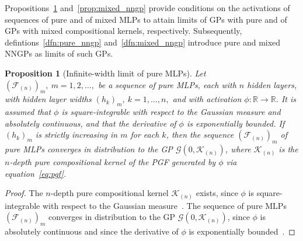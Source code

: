 \documentclass[final, 12pt]{colt2021} %
\newtheorem{prop}{Proposition}
\begin{document}
Propositions~\ref{prop:pure_nngp} and~\ref{prop:mixed_nngp}
provide conditions
on the activations of sequences of pure and of mixed MLPs
to attain limits of GPs with
pure and of GPs with mixed compositional kernels, respectively.
Subsequently,
defintions~\ref{dfn:pure_nngp} and~\ref{dfn:mixed_nngp}
introduce pure and mixed NNGPs
as limits of such GPs.


\begin{prop}[Infinite-width limit of pure MLPs]
\label{prop:pure_nngp}
Let $(\mathcal{F}_{(n)})_{m},~m=1,2,\ldots,$ be a sequence
of pure MLPs,
each with $n$ hidden layers,
with hidden layer widths $(h_{k})_{m},~k=1,\ldots,n,$
and with activation
$\phi:\mathbb{R}\rightarrow\mathbb{R}$.
It is assumed that
$\phi$ is square-integrable with respect to the Gaussian measure and absolutely continuous,
and that the derivative of $\phi$ is exponentially bounded.
If $(h_k)_{m}$ is strictly increasing in $m$ for each $k$,
then the sequence $(\mathcal{F}_{(n)})_{m}$ of pure MLPs converges
in distribution to the GP $\mathcal{G}(0,\mathcal{K}_{(n)})$,
where $\mathcal{K}_{(n)}$ is the $n$-depth pure compositional kernel
of the PGF generated by $\phi$ via equation~\eqref{eq:pgf}.
\end{prop}

\begin{proof}
The $n$-depth pure compositional kernel $\mathcal{K}_{(n)}$ exists,
since $\phi$ is square-integrable with respect to the Gaussian measure~\citep{liang2021}.
The sequence of pure MLPs
$(\mathcal{F}_{(n)})_{m}$ converges in distribution to the
GP $\mathcal{G}(0,\mathcal{K}_{(n)})$,
since $\phi$ is absolutely continuous
and since the derivative of $\phi$
is exponentially bounded~\citep[theorem E.4]{novak2019b}.
\end{proof}
\end{document}
